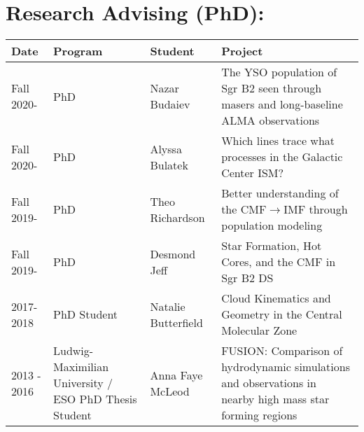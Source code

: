 \setlength{\extrarowheight}{4pt}
\section*{Research Advising (PhD): }
\vspace{-12pt}
\begin{tabular}{p{0.75in}p{1.3in}lp{2.6in}}
    Date  & Program & Student &  Project \\
    \hline
    Fall 2020- & PhD &                                         Nazar Budaiev    & The YSO population of Sgr B2 seen through masers and long-baseline ALMA observations  \\
    Fall 2020- & PhD &                                         Alyssa Bulatek    & Which lines trace what processes in the Galactic Center ISM?  \\
    Fall 2019- & PhD &                                         Theo Richardson    & Better understanding of the CMF$\rightarrow$IMF through population modeling  \\
    Fall 2019- & PhD &                                         Desmond Jeff    &  Star Formation, Hot Cores, and the CMF in Sgr B2 DS \\
    2017-2018 & PhD Student &                                                        Natalie Butterfield &  Cloud Kinematics and Geometry in the Central Molecular Zone \\
    2013 - 2016 & Ludwig-Maximilian University / ESO PhD Thesis Student & Anna Faye McLeod &  FUSION: Comparison of hydrodynamic simulations and observations in nearby high mass star forming regions  \\
\end{tabular}


